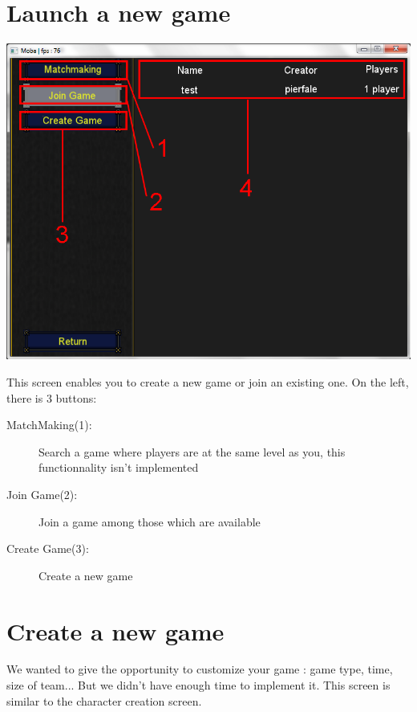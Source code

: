 \documentclass{scrreprt}
\begin{document}
		  \section{Launch a new game}
		  \begin{center}
		  \includegraphics[scale=0.4]{launch_screen.png}
		  \end{center}
		  This screen enables you to create a new game or join an existing one. On the left, there is 3 buttons:
		  \begin{description}
		  \item[MatchMaking(1):]{Search a game where players are at the same level as you, this functionnality isn't implemented}
		  \item[Join Game(2):]{Join a game among those which are available}
		  \item[Create Game(3):]{Create a new game}
		  \end{description}
		  \section{Create a new game}
		  We wanted to give the opportunity to customize your game : game type, time, size of team... But we didn't have enough time to implement it. This screen is similar to the character creation screen. 
\end{document}
